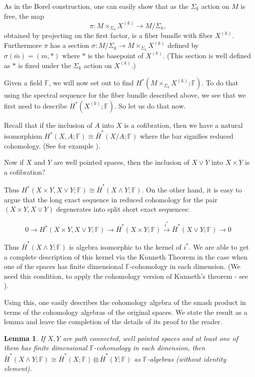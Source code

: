\documentclass{amsart}
\newtheorem{lem}[thm]{Lemma}
\newcommand{\FF}{\mathbb{F}}
\newcommand{\MsigX}{ M \times_{\Sigma_k} X^{(k)}}
\begin{document}
As in the Borel construction, one can easily show that as
the $\Sigma_k$ action on $M$ is free, the map 
$$
\pi: M \times_{\Sigma_k} X^{(k)} \rightarrow M/\Sigma_k,
$$
obtained by projecting on the first factor, is a fiber bundle with
fiber $X^{(k)}$.
Furthermore $\pi$ has a section $\sigma: M/\Sigma_k \rightarrow
M \times_{\Sigma_k} X^{(k)}$ defined by 
$\sigma(\bar{m})=(m,*)$ where $*$ is the basepoint of $X^{(k)}$.
(This section is well defined as $*$ is fixed under the $\Sigma_k$
action on $X^{(k)}$.)

Given a field $\FF$, we will now set out to find $H^*(\MsigX; \FF)$. 
To do that using the spectral sequence for the fiber bundle described 
above, we see that we first need to describe $H^*(X^{(k)}; \FF)$.
So let us do that now.

Recall that if the inclusion of $A$ into $X$ is a cofibration, then 
we have a natural isomorphism 
$H^*(X,A; \FF) \cong \bar{H}^*(X/A; \FF)$ where the bar signifies reduced 
cohomology. (See for example \cite{Bred}).

Now if $X$ and $Y$ are well pointed spaces, 
then the inclusion of $X \vee Y$ into $X \times Y$ is a cofibration?

Thus $H^*(X \times Y, X \vee Y; \FF) \cong \bar{H}^*(X \wedge Y ; \FF)$.
On the other hand, it is easy to argue that the long exact sequence in 
reduced cohomology for the pair $(X \times Y, X \vee Y)$ degenerates 
into split short exact sequences:

$$
0 \rightarrow H^*(X \times Y, X \vee Y; \FF) \rightarrow 
\bar{H}^*(X \times Y; \FF) \overset{i^*}{\rightarrow} 
\bar{H}^*(X \vee Y; \FF) \rightarrow 0
$$
 
Thus $\bar{H}^*(X \wedge Y; \FF)$ is algebra isomorphic to 
the kernel of $i^*$. We are able to get a complete description of this 
kernel via the K$\ddot{u}$nneth Theorem in the case when one of the spaces has 
finite dimensional $\FF$-cohomology in each dimension. (We need this 
condition, to apply the cohomology version of K$\ddot{u}$nneth's theorem - see 
\cite{Bred}).

Using this, one easily describes the cohomology algebra of the smash product 
in terms of the cohomology algebras of the original spaces. We 
state the result as a lemma and leave the completion of the details of its 
proof to the reader.

\begin{lem}
\label{lem: wedge}
If $X, Y$ are path connected, well pointed spaces and at least one of them 
has finite dimensional $\FF$-cohomology in each dimension, then 
$\bar{H}^*(X \wedge Y; \FF) \cong \bar{H}^*(X; \FF) \otimes \bar{H}^*(Y; \FF)$
as $\FF$-algebras (without identity element). 
\end{lem} 
\end{document}
